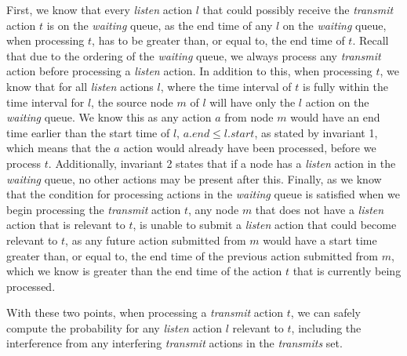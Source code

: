 First, we know that every \textit{listen} action $l$ that could possibly receive the \textit{transmit} action
$t$ is on the \textit{waiting} queue, as the end time of any $l$ on the \textit{waiting} queue, when
processing $t$, has to be greater than, or equal to, the end time of $t$. Recall that due to the ordering of
the \textit{waiting} queue, we always process any \textit{transmit} action before processing a \textit{listen}
action. In addition to this, when processing $t$, we know that for all \textit{listen} actions $l$, where the
time interval of $t$ is fully within the time interval for $l$, the source node $m$ of $l$ will have only the
$l$ action on the \textit{waiting} queue. We know this as any action $a$ from node $m$ would have an end time
earlier than the start time of $l$, $a.\mathit{end} \leq l.\mathit{start}$, as stated by invariant 1, which
means that the $a$ action would already have been processed, before we process $t$. Additionally, invariant 2
states that if a node has a \textit{listen} action in the \textit{waiting} queue, no other actions may be
present after this. Finally, as we know that the condition for processing actions in the \textit{waiting}
queue is satisfied when we begin processing the \textit{transmit} action $t$, any node $m$ that does not have
a \textit{listen} action that is relevant to $t$, is unable to submit a \textit{listen} action that could
become relevant to $t$, as any future action submitted from $m$ would have a start time greater than, or equal
to, the end time of the previous action submitted from $m$, which we know is greater than the end time of the
action $t$ that is currently being processed. \smallbreak


With these two points, when processing a \textit{transmit} action $t$, we can safely compute the
probability for any \textit{listen} action $l$ relevant to $t$, including the interference from any
interfering \textit{transmit} actions in the \textit{transmits} set.


